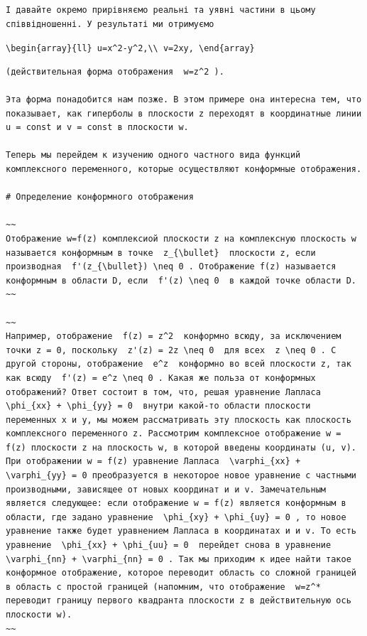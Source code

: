 \documentclass[
  ukrainian,
]{article}
\begin{document}
\begin{verbatim}
І давайте окремо прирівняємо реальні та уявні частини в цьому співвідношенні. У результаті ми отримуємо
\end{verbatim}

\texttt{\textbackslash{}begin\{array\}\{ll\}\ u=x\^{}2-y\^{}2,\textbackslash{}\textbackslash{}\ v=2xy,\ \textbackslash{}end\{array\}}

\begin{verbatim}
(действительная форма отображения  w=z^2 ).

Эта форма понадобится нам позже. В этом примере она интересна тем, что показывает, как гиперболы в плоскости z переходят в координатные линии u = const и v = const в плоскости w.

Теперь мы перейдем к изучению одного частного вида функций комплексного переменного, которые осуществляют конформные отображения.

# Определение конформного отображения

~~
Отображение w=f(z) комплексиой плоскости z на комплексную плоскость w называется конформным в точке  z_{\bullet}  плоскости z, если производная  f'(z_{\bullet}) \neq 0 . Отображение f(z) называется конформным в области D, если  f'(z) \neq 0  в каждой точке области D.
~~

~~
Например, отображение  f(z) = z^2  конформно всюду, за исключением точки z = 0, поскольку  z'(z) = 2z \neq 0  для всех  z \neq 0 . C другой стороны, отображение  e^z  конформно во всей плоскости z, так как всюду  f'(z) = e^z \neq 0 . Какая же польза от конформных отображений? Ответ состоит в том, что, решая уравнение Лапласа  \phi_{xx} + \phi_{yy} = 0  внутри какой-то области плоскости переменных x и y, мы можем рассматривать эту плоскость как плоскость комплексного переменного z. Рассмотрим комплексное отображение w = f(z) плоскости z на плоскость w, в которой введены координаты (u, v). При отображении w = f(z) уравнение Лапласа  \varphi_{xx} + \varphi_{yy} = 0 преобразуется в некоторое новое уравнение с частными производными, зависящее от новых координат и и v. Замечательным является следующее: если отображение w = f(z) является конформным в области, где задано уравнение  \phi_{xy} + \phi_{uy} = 0 , то новое уравнение также будет уравнением Лапласа в координатах и и v. To есть уравнение  \phi_{xx} + \phi_{uu} = 0  перейдет снова в уравнение  \varphi_{nn} + \varphi_{nn} = 0 . Так мы приходим к идее найти такое конформное отображение, которое переводит область со сложной границей в область с простой границей (напомним, что отображение  w=z^*  переводит границу первого квадранта плоскости z в действительную ось плоскости w).
~~


\end{verbatim}
\end{document}
